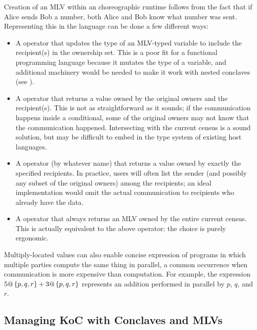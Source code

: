 Creation of an MLV within an choreographic runtime follows from the fact that
if Alice sends Bob a number, both Alice and Bob know what number was sent.
Representing this in the language can be done a few different ways:
\begin{itemize}
  \item A  operator that updates the type of an MLV-typed variable to include the recipient(s) in the ownership set.
        This is a poor fit for a functional programming language because it mutates the type of a variable,
        and additional machinery would be needed to make it work with nested conclaves (see ).
  \item A  operator that returns a value owned by the original owners and the recipient(s).
        This is not as straightforward as it sounds; if the communication happens inside a conditional,
        some of the original owners may not know that the communication happened.
        Intersecting with the current census is a sound solution,
        but may be difficult to embed in the type system of existing host languages.
  \item A  operator (by whatever name) that returns a value owned by exactly the specified recipients.
        In practice, users will often list the sender (and possibly any subset of the original owners) among the recipients;
        an ideal implementation would omit the actual communication to recipients who already have the data.
  \item A  operator that always returns an MLV owned by the entire current census.
        This is actually equivalent to the above  operator; the choice is purely ergonomic.
\end{itemize}

Multiply-located values can also enable concise expression of programs in which multiple parties compute the same thing in parallel,
a common occurrence when communication is more expensive than computation.
For example, the \HLSCentral expression $5@\left\{p,q,r\right\}+3@\left\{p,q,r\right\}$ represents an addition performed in parallel by $p$, $q$, and $r$.

\subsection{Managing KoC with Conclaves and MLVs}
\label{sec:conclaves}

